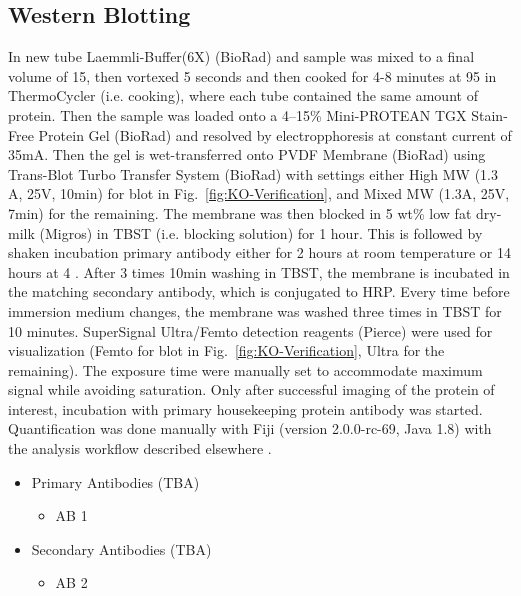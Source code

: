 \subsection{Western Blotting}
In new tube Laemmli-Buffer(6X) (BioRad) and sample was mixed to a final volume of 15\mul{}, then  vortexed 5 seconds and then cooked for 4-8 minutes at 95 \degC in ThermoCycler (i.e. cooking), where each tube contained the same amount of protein. Then the sample was loaded onto a 4–15\% Mini-PROTEAN TGX Stain-Free Protein Gel (BioRad) and resolved by electropphoresis at constant current of 35mA. Then the gel is wet-transferred onto PVDF Membrane (BioRad) using Trans-Blot Turbo Transfer System (BioRad) with settings either High MW (1.3 A, 25V, 10min) for blot in Fig.~\vref{fig:KO-Verification}, and Mixed MW (1.3A, 25V, 7min) for the remaining. The membrane was then blocked in 5 wt\% low fat dry-milk (Migros) in TBST (i.e. blocking solution) for 1 hour. This is followed by shaken incubation primary antibody either for 2 hours at room temperature or 14 hours at 4 \degC{}. After 3 times 10min washing in TBST, the membrane is incubated in the matching secondary antibody, which is conjugated to HRP. Every time before immersion medium changes, the membrane was washed three times in TBST for 10 minutes. SuperSignal Ultra/Femto detection reagents (Pierce) were used for visualization (Femto for blot in Fig.~\vref{fig:KO-Verification}, Ultra for the remaining). The exposure time were manually set to accommodate maximum signal while avoiding saturation. Only after successful imaging of the protein of interest, incubation with primary housekeeping protein antibody was started. Quantification was done manually with Fiji (version 2.0.0-rc-69, Java 1.8) with the analysis workflow described elsewhere \cite{Miller2010}.



\begin{itemize}
    \item Primary Antibodies (TBA)
    \begin{itemize}
		\item AB 1
    \end{itemize}

 	\item Secondary Antibodies (TBA)
    \begin{itemize}
		\item AB 2
    \end{itemize}
\end{itemize}


